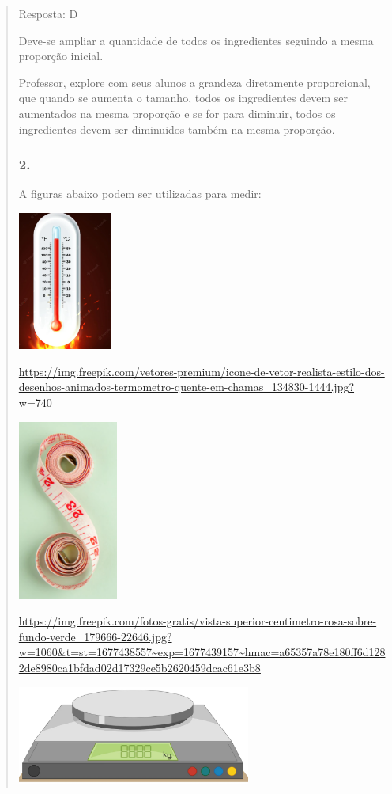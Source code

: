 \begin{enumerate}
\begin{escolha}
\begin{enumerate}
\begin{itemize}
\begin{itemize}
\begin{escolha}
\begin{quote}
\begin{escolha}
{Resposta: D

Deve-se ampliar a quantidade de todos os ingredientes seguindo a mesma
proporção inicial.

Professor, explore com seus alunos a grandeza diretamente proporcional,
que quando se aumenta o tamanho, todos os ingredientes devem ser
aumentados na mesma proporção e se for para diminuir, todos os
ingredientes devem ser diminuidos também na mesma proporção.

\subsubsection{2. }\label{section-118}

A figuras abaixo podem ser utilizadas para medir:

\includegraphics[width=1.22500in,height=1.79354in]{media/image128.png}

\url{https://img.freepik.com/vetores-premium/icone-de-vetor-realista-estilo-dos-desenhos-animados-termometro-quente-em-chamas_134830-1444.jpg?w=740}

\includegraphics[width=1.29167in,height=2.33463in]{media/image129.png}

\url{https://img.freepik.com/fotos-gratis/vista-superior-centimetro-rosa-sobre-fundo-verde_179666-22646.jpg?w=1060\&t=st=1677438557~exp=1677439157~hmac=a65357a78e180ff6d1282de8980ca1bfdad02d17329ce5b2620459dcac61e3b8}

\includegraphics[width=3.02500in,height=1.27488in]{media/image130.png}

}
\end{escolha}
\end{quote}
\end{escolha}
\end{itemize}
\end{itemize}
\end{enumerate}
\end{escolha}
\end{enumerate}
